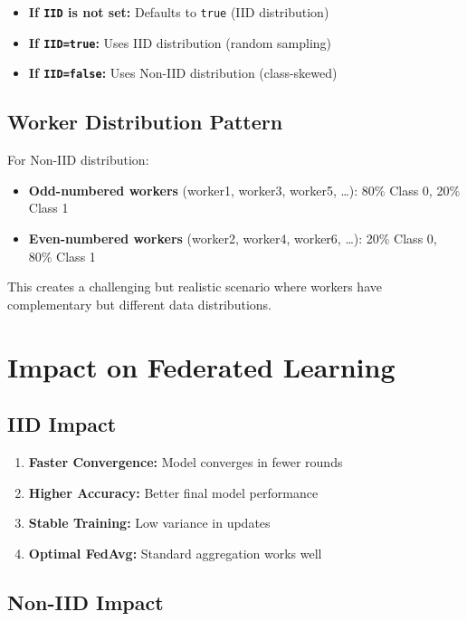 \documentclass[12pt,a4paper]{article}
\begin{document}
\begin{itemize}
    \item \textbf{If \texttt{IID} is not set:} Defaults to \texttt{true} (IID distribution)
    \item \textbf{If \texttt{IID=true}:} Uses IID distribution (random sampling)
    \item \textbf{If \texttt{IID=false}:} Uses Non-IID distribution (class-skewed)
\end{itemize}

\subsection{Worker Distribution Pattern}

For Non-IID distribution:
\begin{itemize}
    \item \textbf{Odd-numbered workers} (worker1, worker3, worker5, \ldots): 80\% Class 0, 20\% Class 1
    \item \textbf{Even-numbered workers} (worker2, worker4, worker6, \ldots): 20\% Class 0, 80\% Class 1
\end{itemize}

This creates a challenging but realistic scenario where workers have complementary but different data distributions.

\section{Impact on Federated Learning}

\subsection{IID Impact}

\begin{enumerate}
    \item \textbf{Faster Convergence:} Model converges in fewer rounds
    \item \textbf{Higher Accuracy:} Better final model performance
    \item \textbf{Stable Training:} Low variance in updates
    \item \textbf{Optimal FedAvg:} Standard aggregation works well
\end{enumerate}

\subsection{Non-IID Impact}
\end{document}
